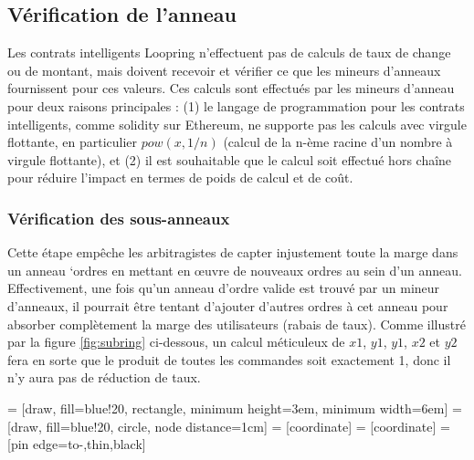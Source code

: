 \documentclass[UTF8,nofonts]{article}
\makeatletter
\newenvironment{figurehere}
 {\def\@captype{figure}}
 {}
\makeatother
\begin{document}
\begin{multicols}{2}
\subsection{Vérification de l'anneau\label{sec:ring_verification}}

Les contrats intelligents Loopring n'effectuent pas de calculs de taux de change ou de montant, mais doivent recevoir et vérifier ce que les mineurs d’anneaux fournissent pour ces valeurs. Ces calculs sont effectués par les mineurs d’anneau pour deux raisons principales : (1) le langage de programmation pour les contrats intelligents, comme solidity\cite{dannen2017introducing} sur Ethereum, ne supporte pas les calculs avec  virgule flottante, en particulier $pow(x, 1/n)$ (calcul de la n-ème racine d'un nombre à virgule flottante), et (2) il est souhaitable que le calcul soit effectué hors chaîne pour réduire l’impact en termes de poids de calcul et de coût.


\subsubsection{Vérification des sous-anneaux\label{sec:sub_ring_check}}
Cette étape empêche les arbitragistes de capter injustement toute la marge dans un anneau ‘ordres en mettant en œuvre de nouveaux ordres au sein d’un anneau. Effectivement, une fois qu'un anneau d'ordre valide est trouvé par un mineur d’anneaux, il pourrait être tentant d'ajouter d'autres ordres à cet anneau pour absorber complètement la marge des utilisateurs (rabais de taux). Comme illustré par la figure \ref{fig:subring} ci-dessous, un calcul méticuleux de $x1$, $y1$, $y1$, $x2$ et $y2$ fera en sorte que le produit de toutes les commandes soit exactement 1, donc il n'y aura pas de réduction de taux.

\begin{center}
\begin{figurehere}
\centering
{} = [draw, fill=blue!20, rectangle, 
    minimum height=3em, minimum width=6em]
 = [draw, fill=blue!20, circle, node distance=1cm]
 = [coordinate]
 = [coordinate]
 = [pin edge={to-,thin,black}]

\begin{tikzpicture}[
    auto, 
    node distance=2cm,
    >=latex',
    font=\bfseries\footnotesize\sffamily,
    order/.style={
		scale=0.7,
		rectangle,
		rounded corners,
		draw=black, 
		text centered,
		minimum height=12mm,
		fill=white
	},
	label/.style={
		scale=0.7
	}
  ]


\end{tikzpicture}
\end{figurehere}
\end{center}
\end{multicols}
\end{document}
